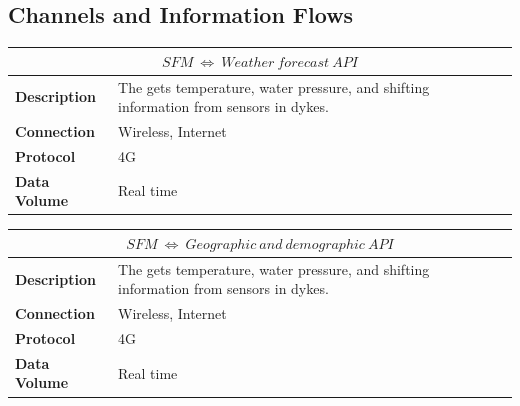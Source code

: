 \subsection{Channels and Information Flows}
\begin{table}[!htbp]
	\centering
    \begin{tabular}{L{} L{}}
    \toprule
     \\ \midrule
    \textbf{Description} & The \ProjectName{} gets temperature, water pressure, and shifting information from sensors in dykes. \\
    \textbf{Connection} & Wireless, Internet \\
    \textbf{Protocol} & 4G \\
    \textbf{Data Volume} & Real time \\
    \bottomrule
    \end{tabular}
\end{table}

\begin{table}[!htbp]
	\centering
    \begin{tabular}{L{} L{}}
    \toprule
     \\ \midrule
    \textbf{Description} & The \ProjectName{} gets temperature, water pressure, and shifting information from sensors in dykes. \\
    \textbf{Connection} & Wireless, Internet \\
    \textbf{Protocol} & 4G \\
    \textbf{Data Volume} & Real time \\
    \bottomrule
    \end{tabular}
\end{table}

